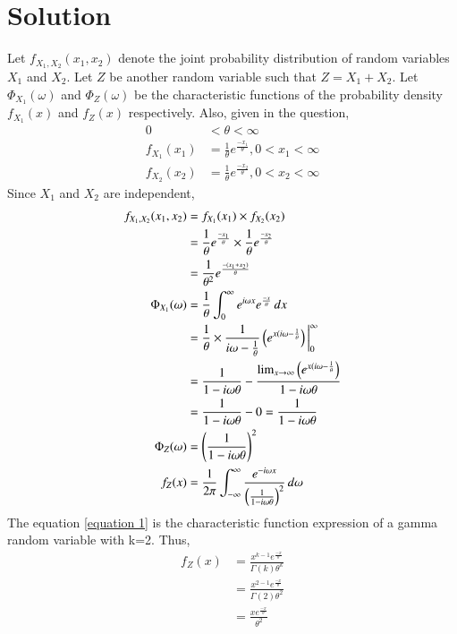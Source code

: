 \documentclass[journal,12pt,twocolumn]{IEEEtran}
\begin{document}
\section*{Solution}
Let $f_{X_1,X_2}(x_1,x_2)$ denote the joint probability distribution of random variables $X_1$ and $X_2$. Let $Z$ be another random variable such that $Z=X_1+X_2$. Let $\Phi_{X_1}(\omega)$ and $\Phi_{Z}(\omega)$ be the characteristic functions of the probability density $f_{X_1}(x)$ and $f_{Z}(x)$ respectively. Also, given in the question,
\begin{align}
    0 &< \theta < \infty
    \\f_{X_1}(x_1) &= \frac{1}{\theta}e^{\frac{-x_1}{\theta}}, 0<x_1<\infty
    \\f_{X_2}(x_2) &= \frac{1}{\theta}e^{\frac{-x_2}{\theta}}, 0<x_2<\infty
\end{align}
Since $X_1$ and $X_2$ are independent, 
\begin{align}
f_{X_1,X_2}(x_1,x_2) &= f_{X_1}(x_1) \times f_{X_2}(x_2)
    \\&= \frac{1}{\theta}e^{\frac{-x_1}{\theta}} \times \frac{1}{\theta}e^{\frac{-x_2}{\theta}}
    \\&= \frac{1}{\theta^2}e^{\frac{-(x_1+x_2)}{\theta}}
    \\\Phi_{X_1}(\omega) &= \frac{1}{\theta} \int_{0}^{\infty}e^{i\omega x} e^{\frac{-x}{\theta}} \,dx
    \\ &= \frac{1}{\theta} \times \frac{1}{i\omega - \frac{1}{\theta}} \left(e^{x(i\omega - \frac{1}{\theta}}\right)\bigg\vert_0^{\infty}
    \\ &= \frac{1}{1-i\omega\theta} - \frac{\lim_{x\rightarrow \infty} \left(e^{x(i\omega - \frac{1}{\theta}}\right)}{1-i\omega\theta}
    \\&= \frac{1}{1-i\omega\theta} - 0 = \frac{1}{1-i\omega\theta} 
    \\ \Phi_{Z}(\omega) &= \left(\frac{1}{1-i\omega\theta} \right)^2
    \\ f_Z(x) &= \frac{1}{2\pi} \int_{-\infty}^{\infty}\frac{e^{-i\omega x}}{\left(\frac{1}{1-i\omega\theta} \right)^2} \,d\omega \label{equation 1}
\end{align}
The equation \eqref{equation 1} is the characteristic function expression of a gamma random variable with k=2. Thus,
\begin{align}
    f_Z(x) &= \frac{x^{k-1}e^{\frac{-x}{\theta}}}{\Gamma(k)\theta^k}
    \\ &=  \frac{x^{2-1}e^{\frac{-x}{\theta}}}{\Gamma(2)\theta^2}
    \\ &= \frac{xe^{\frac{-x}{\theta}}}{\theta^2}
\end{align}
\end{document}
